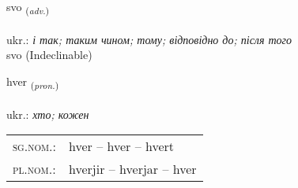 \documentclass[frontgrid, backgrid]{flacards}\usepackage[]{graphicx}\usepackage[]{xcolor}
\begin{document}

\renewcommand{\flhead}{\vskip5pt \fboxsep=0pt {\small\bfseries\footnotesize Atviksorð | прислівник}}
\renewcommand{\fcfoot}{\vskip5pt \fboxsep=0pt \hspace{2pt}{\small\bfseries\footnotesize 1K}}

\renewcommand{\blhead}{\vskip5pt {\small\bfseries\footnotesize Atviksorð | прислівник }}
\renewcommand{\bcfoot}{\vskip5pt \hspace{2pt}{\small\bfseries\footnotesize 1K}}


{svo \small{\textsubscript{(\textit{adv.})}} \\[1ex]
\textphonetic{[svɔː]} \\
ukr.: \emph{і так; таким чином; тому; відповідно до; після того} \\  [2ex]
svo (Indeclinable)}

\renewcommand{\flhead}{\vskip5pt \fboxsep=0pt {\small\bfseries\footnotesize Fornafn | займенник}}
\renewcommand{\fcfoot}{\vskip5pt \fboxsep=0pt \hspace{2pt}{\small\bfseries\footnotesize 1K}}

\renewcommand{\blhead}{\vskip5pt {\small\bfseries\footnotesize Fornafn | займенник }}
\renewcommand{\bcfoot}{\vskip5pt \hspace{2pt}{\small\bfseries\footnotesize 1K}}


{hver \small{\textsubscript{(\textit{pron.})}} \\[1ex] %
\textphonetic{[kʰvɛr]} \\
ukr.: \emph{хто; кожен} \\  [2ex]
\renewcommand*{\arraystretch}{0.8}
\begin{tabular}{ll}
\textsc{sg.nom.}: & hver  --  hver -- hvert \\ 
\textsc{pl.nom.}: & hverjir -- hverjar -- hver
\end{tabular}
}

\renewcommand{\flhead}{\vskip5pt \fboxsep=0pt {\small\bfseries\footnotesize Sagnorð | дієслово}}
\renewcommand{\fcfoot}{\vskip5pt \fboxsep=0pt \hspace{2pt}{\small\bfseries\footnotesize 1K}}
\end{document}
